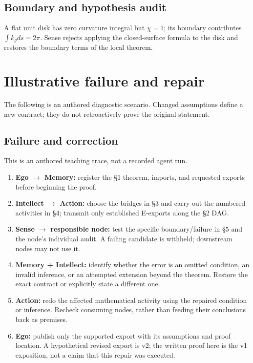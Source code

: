 \documentclass[preprint,12pt,aps,pra,showkeys,amsmath,amssymb,superscriptaddress,floatfix]{revtex4-2}
\theoremstyle{definition}
\theoremstyle{remark}
\providecommand{\tightlist}{\setlength{\itemsep}{2pt}\setlength{\parskip}{0pt}}
\begin{document}
\subsection{Boundary and hypothesis audit}

A flat unit disk has zero curvature integral but \(\chi =1\); its
boundary contributes \(\int k_gds=2\pi\). Sense rejects applying the
closed-surface formula to the disk and restores the boundary terms of
the local theorem.

\section{Illustrative failure and repair}

The following is an authored diagnostic scenario. Changed assumptions
define a new contract; they do not retroactively prove the original
statement.

\subsection{Failure and correction}
This is an authored teaching trace, not a recorded agent run.

\begin{enumerate}
\def\labelenumi{\arabic{enumi}.}
\tightlist
\item
  \textbf{Ego \(\to\) Memory:} register the §1 theorem, imports, and
  requested exports before beginning the proof.
\item
  \textbf{Intellect \(\to\) Action:} choose the bridges in §3 and carry
  out the numbered activities in §4; transmit only established E-exports
  along the §2 DAG.
\item
  \textbf{Sense \(\to\) responsible node:} test the specific
  boundary/failure in §5 and the node's individual audit. A failing
  candidate is withheld; downstream nodes may not use it.
\item
  \textbf{Memory + Intellect:} identify whether the error is an omitted
  condition, an invalid inference, or an attempted extension beyond the
  theorem. Restore the exact contract or explicitly state a different
  one.
\item
  \textbf{Action:} redo the affected mathematical activity using the
  repaired condition or inference. Recheck consuming nodes, rather than
  feeding their conclusions back as premises.
\item
  \textbf{Ego:} publish only the supported export with its assumptions
  and proof location. A hypothetical revised export is v2; the written
  proof here is the v1 exposition, not a claim that this repair was
  executed.
\end{enumerate}
\end{document}
